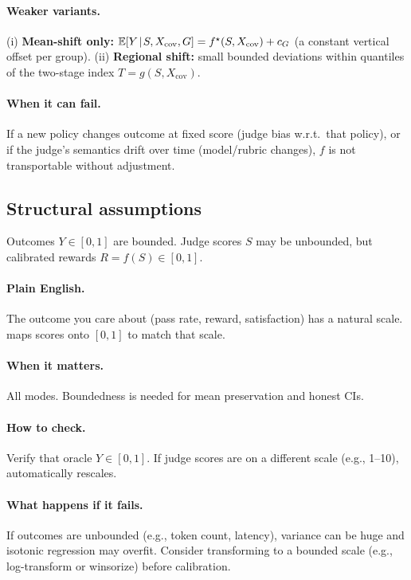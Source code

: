\paragraph{Weaker variants.}
(i) \textbf{Mean-shift only:} $\operatorname{\mathbb{E}}[Y\!\mid\!S,X_{\mathrm{cov}},G] = f^\star(S,X_{\mathrm{cov}}) + c_G$
(a constant vertical offset per group).
(ii) \textbf{Regional shift:} small bounded deviations within quantiles of the two-stage index $T=g(S,X_{\mathrm{cov}})$.

\paragraph{When it can fail.} If a new policy changes outcome at fixed score (judge bias w.r.t.\ that policy), or if the judge's semantics drift over time (model/rubric changes), $f$ is not transportable without adjustment.

\subsection{Structural assumptions}

\begin{assumption}
\label{assum:bounded}
Outcomes $Y \in [0, 1]$ are bounded. Judge scores $S$ may be unbounded, but calibrated rewards $R = f(S) \in [0, 1]$.
\end{assumption}

\paragraph{Plain English.} The outcome you care about (pass rate, reward, satisfaction) has a natural scale. \autocal{} maps scores onto $[0, 1]$ to match that scale.

\paragraph{When it matters.} All modes. Boundedness is needed for mean preservation and honest CIs.

\paragraph{How to check.} Verify that oracle $Y \in [0, 1]$. If judge scores are on a different scale (e.g., 1--10), \autocal{} automatically rescales.

\paragraph{What happens if it fails.} If outcomes are unbounded (e.g., token count, latency), variance can be huge and isotonic regression may overfit. Consider transforming to a bounded scale (e.g., log-transform or winsorize) before calibration.

